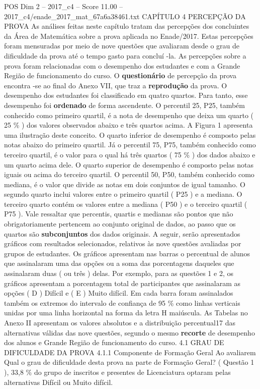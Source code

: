 \begin{textsample}{POS Dim 2 – 2017\_c4 – Score 11.00 – 2017\_c4/enade\_2017\_mat\_67a6a38461.txt}  \label{ex:f2_pos_097}
CAPÍTULO 4 PERCEPÇÃO DA PROVA As análises feitas neste capítulo tratam das percepções dos concluintes da Área de Matemática sobre a prova aplicada no Enade/2017.
Estas percepções foram mensuradas por meio de nove questões que avaliaram desde o grau de dificuldade da prova até o tempo gasto para concluí -la.
As percepções sobre a prova foram relacionadas com o desempenho dos estudantes e com a Grande Região de funcionamento do curso.
O \textbf{questionário} de percepção da prova encontra -se ao final do Anexo VII, que traz a \textbf{reprodução} da prova.
O desempenho dos estudantes foi classificado em quatro quartos.
Para tanto, esse desempenho foi \textbf{ordenado} de forma ascendente.
O percentil 25, P25, também conhecido como primeiro quartil, é a nota de desempenho que deixa um quarto ( 25 \% ) dos valores observados abaixo e três quartos acima.
A Figura 1 apresenta uma ilustração deste conceito.
O quarto inferior de desempenho é composto pelas notas abaixo do primeiro quartil.
Já o percentil 75, P75, também conhecido como terceiro quartil, é o valor para o qual há três quartos ( 75 \% ) dos dados abaixo e um quarto acima dele.
O quarto superior de desempenho é composto pelas notas iguais ou acima do terceiro quartil.
O percentil 50, P50, também conhecido como mediana, é o valor que divide as notas em dois conjuntos de igual tamanho.
O segundo quarto inclui valores entre o primeiro quartil ( P25 ) e a mediana.
O terceiro quarto contém os valores entre a mediana ( P50 ) e o terceiro quartil ( P75 ).
Vale ressaltar que percentis, quartis e medianas são pontos que não obrigatoriamente pertencem ao conjunto original de dados, ao passo que os quartos são \textbf{subconjuntos} dos dados originais.
A seguir, serão apresentados gráficos com resultados selecionados, relativos às nove questões avaliadas por grupos de estudantes.
Os gráficos apresentam nas barras o percentual de alunos que assinalaram uma das opções ou a soma das porcentagens daqueles que assinalaram duas ( ou três ) delas.
Por exemplo, para as questões 1 e 2, os gráficos apresentam a porcentagem total de participantes que assinalaram as opções ( D ) Difícil e ( E ) Muito difícil.
Em cada barra foram assinalados também os extremos do intervalo de confiança de 95 \% como linhas verticais unidas por uma linha horizontal na forma da letra H maiúscula.
As Tabelas no Anexo II apresentam os valores absolutos e a distribuição percentual17 das alternativas válidas das nove questões, segundo o mesmo \textbf{recorte} de desempenho dos alunos e Grande Região de funcionamento do curso. 4.1 GRAU DE DIFICULDADE DA PROVA 4.1.1 Componente de Formação Geral Ao avaliarem Qual o grau de dificuldade desta prova na parte de Formação Geral? ( Questão 1 ), 33,8 \% do grupo de inscritos e presentes de Licenciatura optaram pelas alternativas Difícil ou Muito difícil.

\end{textsample}
